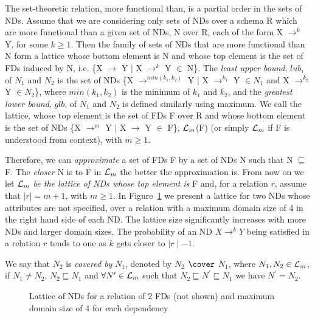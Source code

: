 The set-theoretic relation, more functional than, 
is a partial order in the sets of NDs.
Assume that we are considering only sets of NDs over a schema R which
are more functional  
than a given set of NDs, N over R, each of the form X $\to^k$ Y, 
for some $k \ge 1$.
Then the family of sets of NDs that are more functional than N form a lattice
whose bottom element is N and whose top element is the set of FDs
induced by N, i.e. \{X $\to$ Y $\mid$ X $\to^k$ Y $\in$ N\}.
The {\em least upper bound}, $lub$, of $N_1$ and $N_2$ is the set of NDs
\{X $\to^{min(k_1, k_2)}$ Y $\mid$
X $\to^{k_1}$ Y $\in N_1$ and X $\to^{k_2}$ Y $\in N_2$\},
where $min(k_1, k_2)$ is the minimum of $k_1$ and $k_2$, and the 
{\em greatest lower bound}, $glb$, of $N_1$ and $N_2$ is defined similarly using maximum.
We call the lattice, whose top element is the set of FDs F over R
and whose bottom element is the set of NDs
\{X $\to^m$ Y $\mid$ X $\to$ Y $\in$ F\}, ${\cal L}_m$(F)
(or simply ${\cal L}_m$ if F is understood from context), with $m \ge 1$.


Therefore, we can {\em approximate} a set of FDs F by a set of NDs N
such that N $\sqsubseteq$ F. 
The {\em closer} N is to F in ${\cal L}_m$ the better the approximation is.
From now on we let ${\cal L}_m$ 
{\em be the lattice of NDs whose top element is} F
and, for a relation $r$, assume that $\mid r \mid = m+1$, with $m \ge 1$. In
Figure~\ref{latt:1} we present a lattice for two NDs whose attributes
are not specified, over a relation with a maximum domain size of 4 in
the right hand side of each ND. The lattice size significantly increases
with more NDs and larger domain sizes.
The probability of
an ND $X \to^k Y$ being satisfied in a relation $r$ tends to one as
$k$ gets closer to $\mid r \mid - 1$. 
\begin{definition}[Covered By]\label{def:covered}
\begin{rm}
We say that $N_2$ is {\em covered by} $N_1$, denoted by $N_2$ $\cover$
$N_1$, where $N_1, N_2 \in {\cal L}_m$, 
if $N_1 \not= N_2$, $N_2 \sqsubseteq N_1$ and
$\forall N^\prime \in {\cal L}_m$ such that 
$N_2 \sqsubseteq N^\prime \sqsubseteq N_1$ we have $N^\prime = N_2$.
\end{rm}
\end{definition}

\begin{figure}[ht]
\centerline{}
\caption{\label{latt:1}Lattice of NDs for a relation of 2 FDs
(not shown) and maximum domain size of 4 for each dependency}
\end{figure}

